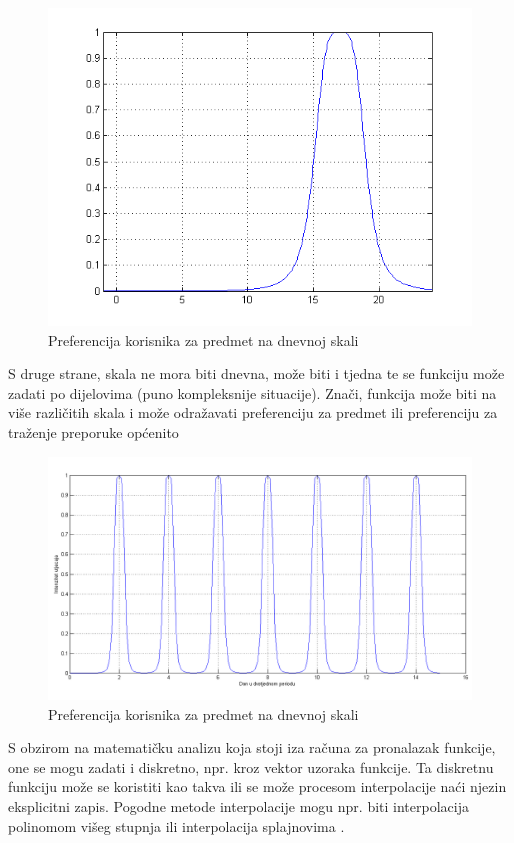 \documentclass[times, utf8, diplomski, numeric]{fer}
\begin{document}
\begin{figure}[!htb]
	\centering
	\includegraphics[width=12cm]{images/zvonolika1matlab.png}
	\caption{Preferencija korisnika za predmet na dnevnoj skali}
	\label{fig:Gauss1}
\end{figure}

S druge strane, skala ne mora biti dnevna, može biti i tjedna te se funkciju
može zadati po dijelovima (puno kompleksnije situacije). 
Znači, funkcija može biti na više različitih skala i može odražavati
preferenciju za predmet ili preferenciju za traženje preporuke općenito
\begin{figure}[!htb]
	\centering
	\includegraphics[width=14.21cm]{images/neprigusenocropped.png}
	\caption{Preferencija korisnika za predmet na dnevnoj skali}
	\label{fig:Gauss2}
\end{figure}

S obzirom na matematičku analizu koja stoji iza računa za pronalazak funkcije,
one se mogu zadati i diskretno, npr. kroz vektor uzoraka funkcije. Ta diskretnu
funkciju može se koristiti kao takva ili se može procesom interpolacije naći
njezin eksplicitni zapis. Pogodne metode interpolacije mogu npr. biti
interpolacija polinomom višeg stupnja ili interpolacija splajnovima
.
\end{document}
